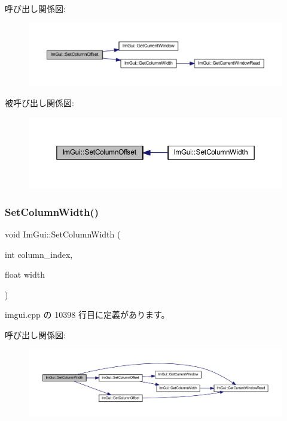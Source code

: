 呼び出し関係図\+:\nopagebreak
\begin{figure}[H]
\begin{center}
\leavevmode
\includegraphics[width=350pt]{namespace_im_gui_a8cc207211d6cf3f77b505e24aed4ebcc_cgraph}
\end{center}
\end{figure}
被呼び出し関係図\+:\nopagebreak
\begin{figure}[H]
\begin{center}
\leavevmode
\includegraphics[width=350pt]{namespace_im_gui_a8cc207211d6cf3f77b505e24aed4ebcc_icgraph}
\end{center}
\end{figure}
\mbox{\label{namespace_im_gui_af17222ec47aebb5ede00be7b52de9f5d}} 
\subsubsection{\texorpdfstring{Set\+Column\+Width()}{SetColumnWidth()}}
{\footnotesize\ttfamily void Im\+Gui\+::\+Set\+Column\+Width (\begin{DoxyParamCaption}\item[{int}]{column\+\_\+index,  }\item[{float}]{width }\end{DoxyParamCaption})}



 imgui.\+cpp の 10398 行目に定義があります。

呼び出し関係図\+:\nopagebreak
\begin{figure}[H]
\begin{center}
\leavevmode
\includegraphics[width=350pt]{namespace_im_gui_af17222ec47aebb5ede00be7b52de9f5d_cgraph}
\end{center}
\end{figure}
\mbox{\label{namespace_im_gui_a289dbbbffdadcf1231821d97a7c4a9be}} 
